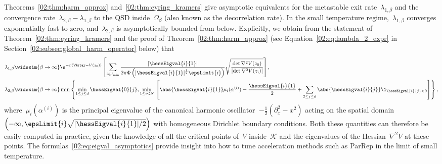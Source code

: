     Theorems~\ref{02:thm:harm_approx} and~\ref{02:thm:eyring_kramers} give asymptotic equivalents for the metastable exit rate~$\lambda_{1,\beta}$ and the convergence rate~$\lambda_{2,\beta}-\lambda_{1,\beta}$ to the QSD inside~$\Omega_\beta$ (also known as the decorrelation rate).
    In the small temperature regime,~$\lambda_{1,\beta}$ converges exponentially fast to zero, and~$\lambda_{2,\beta}$ is asymptotically bounded from below.
    Explicitly, we obtain from the statement of Theorem~\ref{02:thm:eyring_kramers} and the proof of Theorem~\ref{02:thm:harm_approx} (see Equation~\eqref{02:eq:lambda_2_expr} in Section~\ref{02:subsec:global_harm_operator} below) that
    \begin{equation}
        \label{02:eq:eigval_asymptotics}        
        \begin{aligned}
            \lambda_{1,\beta} &\widesim{\beta\to\infty}\e^{-\beta(\Vstar-V(z_0))} \left[\sum_{i\in I_{\min}} \frac{|\hessEigval{i}{1}|}{2\pi\Phi\left(|\hessEigval{i}{1}|^{\frac12}\epsLimit{i}\right)}\sqrt{\frac{\det \nabla^2 V(z_0)}{\left|\det \nabla ^2 V(z_i)\right|}}\right],\\
            \lambda_{2,\beta}&\widesim{\beta\to\infty}\min\left\{\underset{1\leq j\leq d}{\min}\,\hessEigval{0}{j},\underset{1\leq i<N}{\min}\,\left[\abs{\hessEigval{i}{1}}\mu_i(\alpha^{(i)})-\frac{\hessEigval{i}{1}}2 + \sum_{2\leq j\leq d}\abs{\hessEigval{i}{j}}\1_{\hessEigval{i}{j}<0}\right]\right\},
        \end{aligned}
    \end{equation}
    where~$\mu_i(\alpha^{(i)})$ is the principal eigenvalue of the canonical harmonic oscillator~$-\frac12\left(\partial_x^2-x^2\right)$ acting on the spatial domain~$\left(-\infty,\epsLimit{i}\sqrt{|\hessEigval{i}{1}|/2}\right)$ with homogeneous Dirichlet boundary conditions.
    Both these quantities can therefore be easily computed in practice, given the knowledge of all the critical points of~$V$ inside~$\mathcal K$ and the eigenvalues of the Hessian~$\nabla^2 V$ at these points. The formulas~\eqref{02:eq:eigval_asymptotics} provide insight into how to tune acceleration methods such as ParRep in the limit of small temperature.
